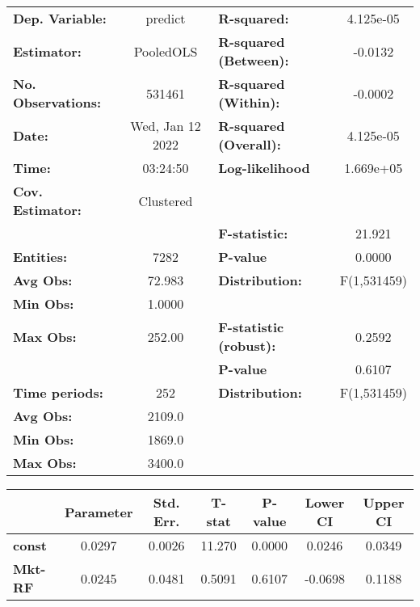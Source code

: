 \begin{center}
\begin{tabular}{lclc}
\toprule
\textbf{Dep. Variable:}    &      predict       & \textbf{  R-squared:         }   &    4.125e-05     \\
\textbf{Estimator:}        &     PooledOLS      & \textbf{  R-squared (Between):}  &     -0.0132      \\
\textbf{No. Observations:} &       531461       & \textbf{  R-squared (Within):}   &     -0.0002      \\
\textbf{Date:}             &  Wed, Jan 12 2022  & \textbf{  R-squared (Overall):}  &    4.125e-05     \\
\textbf{Time:}             &      03:24:50      & \textbf{  Log-likelihood     }   &    1.669e+05     \\
\textbf{Cov. Estimator:}   &     Clustered      & \textbf{                     }   &                  \\
\textbf{}                  &                    & \textbf{  F-statistic:       }   &      21.921      \\
\textbf{Entities:}         &        7282        & \textbf{  P-value            }   &      0.0000      \\
\textbf{Avg Obs:}          &       72.983       & \textbf{  Distribution:      }   &   F(1,531459)    \\
\textbf{Min Obs:}          &       1.0000       & \textbf{                     }   &                  \\
\textbf{Max Obs:}          &       252.00       & \textbf{  F-statistic (robust):} &      0.2592      \\
\textbf{}                  &                    & \textbf{  P-value            }   &      0.6107      \\
\textbf{Time periods:}     &        252         & \textbf{  Distribution:      }   &   F(1,531459)    \\
\textbf{Avg Obs:}          &       2109.0       & \textbf{                     }   &                  \\
\textbf{Min Obs:}          &       1869.0       & \textbf{                     }   &                  \\
\textbf{Max Obs:}          &       3400.0       & \textbf{                     }   &                  \\
\bottomrule
\end{tabular}
\begin{tabular}{lcccccc}
                & \textbf{Parameter} & \textbf{Std. Err.} & \textbf{T-stat} & \textbf{P-value} & \textbf{Lower CI} & \textbf{Upper CI}  \\
\midrule
\textbf{const}  &       0.0297       &       0.0026       &      11.270     &      0.0000      &       0.0246      &       0.0349       \\
\textbf{Mkt-RF} &       0.0245       &       0.0481       &      0.5091     &      0.6107      &      -0.0698      &       0.1188       \\
\bottomrule
\end{tabular}
\end{center}
